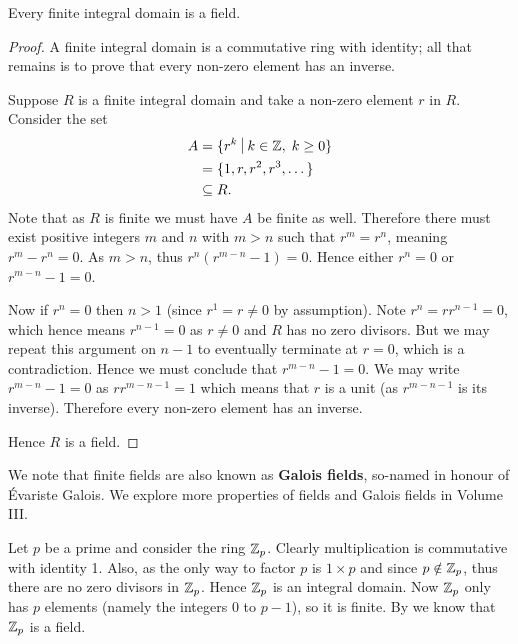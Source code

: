 \begin{theorem}\label{thrm-finite-integral-domain-is-field}
    Every finite integral domain is a field.
\end{theorem}
\begin{proof}
    A finite integral domain is a commutative ring with identity; all that remains is to prove that every non-zero element has an inverse.

    Suppose $R$ is a finite integral domain and take a non-zero element $r$ in $R$. Consider the set
    \begin{align*}
        A &= \{r^k \vert k \in \Z,\;k\geq 0\}\\
        &= \{1, r, r^2, r^3, \dots\}\\
        &\subseteq R.
    \end{align*}
    Note that as $R$ is finite we must have $A$ be finite as well. Therefore there must exist positive integers $m$ and $n$ with $m > n$ such that $r^m = r^n$, meaning $r^m - r^n = 0$. As $m > n$, thus $r^n\left(r^{m-n}-1\right) = 0$. Hence either $r^n = 0$ or $r^{m-n} - 1 = 0$.

    Now if $r^n = 0$ then $n > 1$ (since $r^1 = r \neq 0$ by assumption). Note $r^n = rr^{n-1} = 0$, which hence means $r^{n-1} = 0$ as $r \neq 0$ and $R$ has no zero divisors. But we may repeat this argument on $n - 1$ to eventually terminate at $r = 0$, which is a contradiction. Hence we must conclude that $r^{m-n} - 1 = 0$. We may write $r^{m-n}-1 = 0$ as $rr^{m-n-1} = 1$ which means that $r$ is a unit (as $r^{m-n-1}$ is its inverse). Therefore every non-zero element has an inverse.

    Hence $R$ is a field.
\end{proof}

\begin{remark}
    We note that finite fields are also known as \textbf{Galois fields}, so-named in honour of \'Evariste Galois. We explore more properties of fields and Galois fields in Volume III.
\end{remark}

\begin{example}
    Let $p$ be a prime and consider the ring $\mathbb{Z}_p$. Clearly multiplication is commutative with identity 1. Also, as the only way to factor $p$ is $1 \times p$ and since $p \notin \mathbb{Z}_p$, thus there are no zero divisors in $\mathbb{Z}_p$. Hence $\mathbb{Z}_p$ is an integral domain. Now $\mathbb{Z}_p$ only has $p$ elements (namely the integers 0 to $p - 1$), so it is finite. By  we know that $\mathbb{Z}_p$ is a field.
\end{example}

